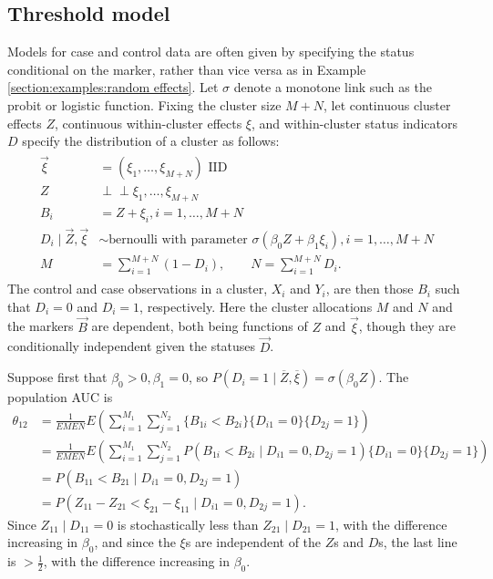 \documentclass[12pt]{article}
\DeclareMathOperator{\AUC}{AUC}
\newcommand{\E}{E}
\renewcommand{\P}{P}
\newcommand{\cind}{\perp \!\!\! \perp}
\newcommand{\aucpop}{\theta_{12}}%
\begin{document}
\subsection{Threshold model}\label{section:examples:threshold}
Models for case and control data are often given by specifying the
status conditional on the marker, rather than vice versa as in
Example \ref{section:examples:random effects}. Let $\sigma$ denote a monotone link such as the probit or logistic function. Fixing the cluster size $M+N$, let continuous cluster
effects $Z$, continuous within-cluster effects $\xi$, and within-cluster
 status indicators $D$ specify the distribution of a cluster as follows:
\begin{gather}
  \begin{aligned}
    \vec{\xi}&=(\xi_1,\ldots,\xi_{M+N})\text{ IID}\\
    Z &\cind \xi_1,\ldots,\xi_{M+N} \\
    B_i &= Z+\xi_i,i=1,\ldots,M+N\\
    D_i \mid \vec{Z},\vec{\xi} &\sim \text{bernoulli with parameter } \sigma(\beta_0 Z+\beta_1\xi_i),i=1,\ldots,M+N\\
    M &= \sum_{i=1}^{M+N} (1-D_i),\qquad     N = \sum_{i=1}^{M+N} D_i.
    \label{model:logistic}
\end{aligned}
\end{gather}
The control and case observations in a cluster, $X_i$ and $Y_i$, are then those $B_i$ such that $D_i=0$ and $D_i=1$, respectively. Here the cluster allocations $M$ and $N$ and the markers $\vec{B}$ are dependent, both being functions of $Z$ and $\vec{\xi}$, though they are conditionally independent given the statuses $\vec{D}$.

Suppose first that $\beta_0>0,\beta_1=0$, so $\P(D_i=1\mid \overline Z,\overline \xi)=\sigma(\beta_0 Z)$. The population AUC is
\begin{align}
  \aucpop &=\frac{1}{\E M \E N}\E\left(\sum_{i=1}^{M_1}\sum_{j=1}^{N_2}\{B_{1i}<B_{2i}\}\{D_{i1}=0\}\{D_{2j}=1\}\right)\\
	&=\frac{1}{\E M \E N}\E\left(\sum_{i=1}^{M_1}\sum_{j=1}^{N_2}\P(B_{1i}<B_{2i}\mid D_{i1}=0, D_{2j}=1)\{D_{i1}=0\}\{D_{2j}=1\}\right)\\
	&= \P(B_{11}<B_{21}\mid D_{i1}=0, D_{2j}=1)\\
	&=\P(Z_{11}-Z_{21} < \xi_{21}-\xi_{11}\mid D_{i1}=0, D_{2j}=1).
\end{align}
Since $Z_{11}\mid D_{11}=0$ is stochastically less than $Z_{21}\mid D_{21}=1$, with the difference increasing in $\beta_0$, and since the $\xi$s are independent of the $Z$s and $D$s, the last line is $>\frac12$, with the difference increasing in $\beta_0$.
\end{document}
